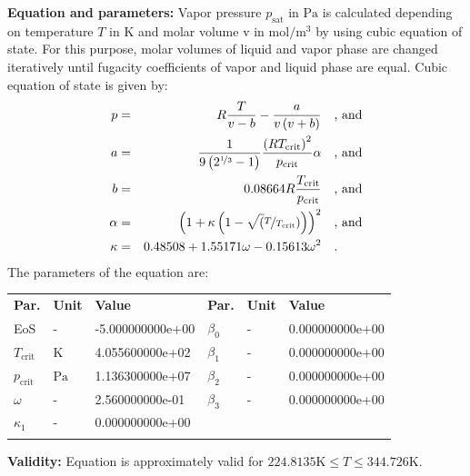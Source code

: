 \textbf{Equation and parameters:}
\newline
%
Vapor pressure $p_\mathrm{sat}$ in $\si{\pascal}$ is calculated depending on temperature $T$ in $\si{\kelvin}$ and molar volume v in $\si{\mole\per\cubic\meter}$ by using cubic equation of state. For this purpose, molar volumes of liquid and vapor phase are changed iteratively until fugacity coefficients of vapor and liquid phase are equal. Cubic equation of state is given by:
\begin{equation*}
\begin{split}
p &=& R \frac{T}{v - b} - \frac{a}{v \left(v + b\right)} & \quad\text{, and} \\
a &=& \frac{1}{9 \left(2^{\nicefrac{1}{3}} - 1\right)} \frac{\left(R T_\mathrm{crit} \right)^2}{p_\mathrm{crit}} \alpha & \quad\text{, and} \\
b &=& 0.08664 R \frac{T_\mathrm{crit}}{p_\mathrm{crit}} & \quad\text{, and} \\
\alpha &=& \left(1 + \kappa \left(1 - \sqrt(\nicefrac{T}{T_\mathrm{crit}}) \right) \right)^2 & \quad\text{, and} \\
\kappa &=& 0.48508 + 1.55171 \omega - 0.15613 \omega^2 & \quad\text{.}
\end{split}
\end{equation*}
%
The parameters of the equation are:
%
\begin{longtable}[l]{lll|lll}
\toprule
\addlinespace
\textbf{Par.} & \textbf{Unit} & \textbf{Value} &	\textbf{Par.} & \textbf{Unit} & \textbf{Value} \\
\addlinespace
\midrule
\endhead

\bottomrule
\endfoot
\bottomrule
\endlastfoot
\addlinespace

EoS & - & -5.000000000e+00 & $\beta_0$ & - & 0.000000000e+00 \\
$T_\mathrm{crit}$ & $\si{\kelvin}$ & 4.055600000e+02 & $\beta_1$ & - & 0.000000000e+00 \\
$p_\mathrm{crit}$ & $\si{\pascal}$ & 1.136300000e+07 & $\beta_2$ & - & 0.000000000e+00 \\
$\omega$ & - & 2.560000000e-01 & $\beta_3$ & - & 0.000000000e+00 \\
$\kappa_1$ & - & 0.000000000e+00 & & & \\

\addlinespace\end{longtable}

\textbf{Validity:}
\newline
Equation is approximately valid for $224.8135 \si{\kelvin} \leq T \leq 344.726 \si{\kelvin}$.
\newline

